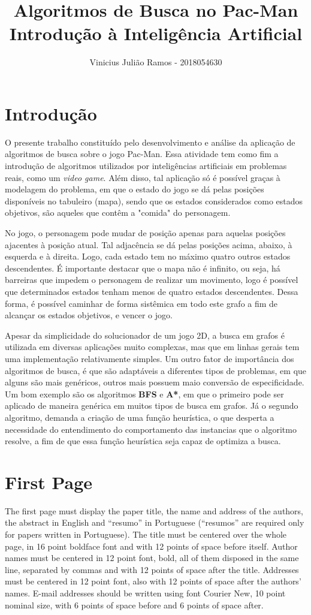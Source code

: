 \documentclass[12pt]{article}
\title{Algoritmos de Busca no Pac-Man \\ Introdução à Inteligência Artificial}
\author{Vinicius Julião Ramos - 2018054630}
\begin{document}
 

\section{Introdução}

O presente trabalho constituído pelo desenvolvimento e análise da aplicação
de algoritmos de busca sobre o jogo Pac-Man.
Essa atividade tem como fim a introdução de algoritmos utilizados por
inteligências artificiais em problemas reais, como um \textit{video game}.
Além disso, tal aplicação só é possível graças à modelagem do problema, em que
o estado do jogo se dá pelas posições disponíveis no tabuleiro (mapa),
sendo que os estados considerados como estados objetivos, são aqueles que
contêm a "comida" do personagem.

No jogo, o personagem pode mudar de posição apenas para aquelas posições
ajacentes à posição atual.
Tal adjacência se dá pelas posições acima, abaixo, à esquerda e à direita.
Logo, cada estado tem no máximo quatro outros estados descendentes.
É importante destacar que o mapa não é infinito, ou seja, há barreiras que
impedem o personagem de realizar um movimento, logo é possível que
determinados estados tenham menos de quatro estados descendentes.
Dessa forma, é possível caminhar de forma sistêmica em todo este grafo a fim
de alcançar os estados objetivos, e vencer o jogo.

Apesar da simplicidade do solucionador de um jogo 2D, a busca em grafos é
utilizada em diversas aplicações muito complexas, mas que em linhas gerais tem
uma implementação relativamente simples.
Um outro fator de importância dos algoritmos de busca, é que são adaptáveis a
diferentes tipos de problemas, em que alguns são mais genéricos, outros mais
possuem maio conversão de especificidade.
Um bom exemplo são os algoritmos \textbf{BFS} e \textbf{A*}, em que o primeiro
pode ser aplicado de maneira genérica em muitos tipos de busca em grafos.
Já o segundo algoritmo, demanda a criação de uma função heurística, o que
desperta a necessidade do entendimento do comportamento das instancias
que o algoritmo resolve, a fim de que essa função heurística seja capaz
de optimiza a busca.


\section{First Page} \label{sec:firstpage}

The first page must display the paper title, the name and address of the
authors, the abstract in English and ``resumo'' in Portuguese (``resumos'' are
required only for papers written in Portuguese). The title must be centered
over the whole page, in 16 point boldface font and with 12 points of space
before itself. Author names must be centered in 12 point font, bold, all of
them disposed in the same line, separated by commas and with 12 points of
space after the title. Addresses must be centered in 12 point font, also with
12 points of space after the authors' names. E-mail addresses should be
written using font Courier New, 10 point nominal size, with 6 points of space
before and 6 points of space after.
\end{document}

